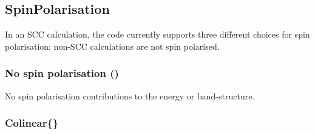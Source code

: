 \subsection{SpinPolarisation}
\label{sec:dftbp.SpinPolarisation}

In an SCC calculation, the code currently supports three different
choices for spin polarisation; non-SCC calculations are not spin
polarised.

\subsubsection{No spin polarisation (\is{\cb})}


No spin polarisation contributions to the energy or band-structure.

\subsubsection{Colinear\{\}}
\label{sec:dftbp.Colinear}

